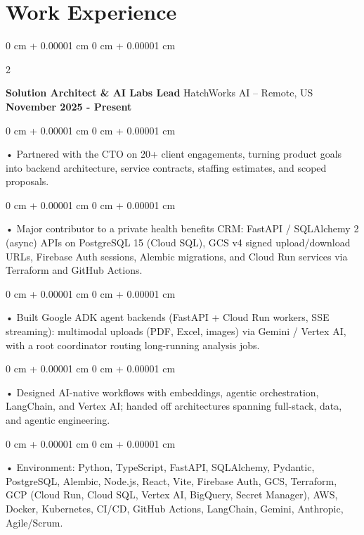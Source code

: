 \documentclass[10pt, letterpaper]{article}
\newenvironment{onecolentry}{
    \begin{adjustwidth}{
        0 cm + 0.00001 cm
    }{
        0 cm + 0.00001 cm
    }
}{
    \end{adjustwidth}
} %
\newenvironment{twocolentry}[2][]{
    \onecolentry
    \def\secondColumn{#2}
    \setcolumnwidth{\fill, 4.5 cm}
    \begin{paracol}{2}
}{
    \switchcolumn \raggedleft \secondColumn
    \end{paracol}
    \endonecolentry
} %
\begin{document}
    \vspace{0.15cm}
    \section{Work Experience}
        \vspace{0.1cm}

        \begin{twocolentry}{
            \textbf{November 2025 - Present}
        }
            \textbf{Solution Architect \& AI Labs Lead} HatchWorks AI -- Remote, US\end{twocolentry}

        \begin{onecolentry}
             • Partnered with the CTO on 20+ client engagements, turning product goals into backend architecture, service contracts, staffing estimates, and scoped proposals.
        \end{onecolentry}
        \begin{onecolentry}
             • Major contributor to a private health benefits CRM: FastAPI / SQLAlchemy 2 (async) APIs on PostgreSQL 15 (Cloud SQL), GCS v4 signed upload/download URLs, Firebase Auth sessions, Alembic migrations, and Cloud Run services via Terraform and GitHub Actions.
        \end{onecolentry}
        \begin{onecolentry}
             • Built Google ADK agent backends (FastAPI + Cloud Run workers, SSE streaming): multimodal uploads (PDF, Excel, images) via Gemini / Vertex AI, with a root coordinator routing long-running analysis jobs.
        \end{onecolentry}
        \begin{onecolentry}
             • Designed AI-native workflows with embeddings, agentic orchestration, LangChain, and Vertex AI; handed off architectures spanning full-stack, data, and agentic engineering.
        \end{onecolentry}
        \begin{onecolentry}
             • Environment: Python, TypeScript, FastAPI, SQLAlchemy, Pydantic, PostgreSQL, Alembic, Node.js, React, Vite, Firebase Auth, GCS, Terraform, GCP (Cloud Run, Cloud SQL, Vertex AI, BigQuery, Secret Manager), AWS, Docker, Kubernetes, CI/CD, GitHub Actions, LangChain, Gemini, Anthropic, Agile/Scrum.
        \end{onecolentry}

        \vspace{0.1cm}
\end{document}
